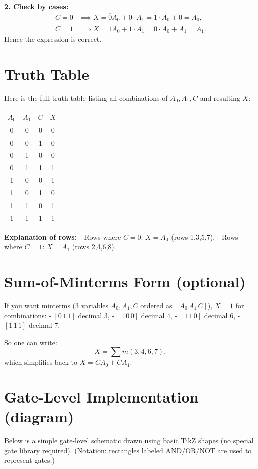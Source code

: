 \documentclass[a4paper,12pt]{article}
\begin{document}
\textbf{2. Check by cases:}
\[
\begin{aligned}
C=0 &\implies X = \overline{0}A_0 + 0\cdot A_1 = 1\cdot A_0 + 0 = A_0,\\
C=1 &\implies X = \overline{1}A_0 + 1\cdot A_1 = 0\cdot A_0 + A_1 = A_1.
\end{aligned}
\]
Hence the expression is correct.

\section*{\textbf{Truth Table}}

Here is the full truth table listing all combinations of \(A_0, A_1, C\) and resulting \(X\):

\begin{center}
\begin{tabular}{|c|c|c|c|}
\hline
$A_0$ & $A_1$ & $C$ & $X$ \\ \hline
0 & 0 & 0 & 0 \\ \hline
0 & 0 & 1 & 0 \\ \hline
0 & 1 & 0 & 0 \\ \hline
0 & 1 & 1 & 1 \\ \hline
1 & 0 & 0 & 1 \\ \hline
1 & 0 & 1 & 0 \\ \hline
1 & 1 & 0 & 1 \\ \hline
1 & 1 & 1 & 1 \\ \hline
\end{tabular}
\end{center}

\textbf{Explanation of rows:}
- Rows where \(C=0\): \(X = A_0\) (rows 1,3,5,7).
- Rows where \(C=1\): \(X = A_1\) (rows 2,4,6,8).

\section*{\textbf{Sum-of-Minterms Form (optional)}}
If you want minterms (3 variables \(A_0,A_1,C\) ordered as \([A_0\,A_1\,C]\)), \(X=1\) for combinations:
- \([0\,1\,1]\) decimal \(3\),
- \([1\,0\,0]\) decimal \(4\),
- \([1\,1\,0]\) decimal \(6\),
- \([1\,1\,1]\) decimal \(7\).

So one can write:
\[
X = \sum m(3,4,6,7),
\]
which simplifies back to \(X=\overline{C}A_0 + C A_1\).

\section*{\textbf{Gate-Level Implementation (diagram)}}
Below is a simple gate-level schematic drawn using basic TikZ shapes (no special gate library required).  
(Notation: rectangles labeled AND/OR/NOT are used to represent gates.)
\end{document}
